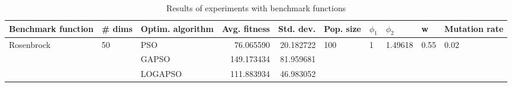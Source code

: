 \begin{table}
\centering
\caption{Results of experiments with benchmark functions}
\begin{tabular}{lllrrlllll}
\toprule
         Benchmark function &             \# dims & Optim. algorithm &  Avg. fitness &  Std. dev. &            Pop. size &         $\phi_{1}$ &               $\phi_{2}$ &                     w &         Mutation rate \\
\midrule
\multirow{3}{*}{Rosenbrock} & \multirow{3}{*}{50} &              PSO &     76.065590 &  20.182722 & \multirow{3}{*}{100} & \multirow{3}{*}{1} & \multirow{3}{*}{1.49618} & \multirow{3}{*}{0.55} & \multirow{3}{*}{0.02} \\
                            &                     &            GAPSO &    149.173434 &  81.959681 &                      &                    &                          &                       &                       \\
                            &                     &          LOGAPSO &    111.883934 &  46.983052 &                      &                    &                          &                       &                       \\
\bottomrule
\end{tabular}
\end{table}
